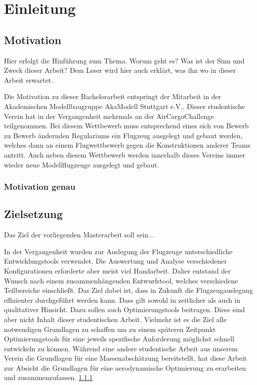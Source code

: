 \chapter{Einleitung}					%
\label{chap:einleitung}					%

\section{Motivation}					%
\label{sec:motivation}
Hier erfolgt die Hinführung zum Thema. Worum geht es? Was ist der Sinn und Zweck dieser Arbeit? Dem Leser wird hier auch erklärt, was ihn wo in dieser Arbeit erwartet.

Die Motivation zu dieser Bachelorarbeit entspringt der Mitarbeit in der Akademischen Modellbaugruppe AkaModell Stuttgart e.V.. Dieser studentische Verein hat in der Vergangenheit mehrmals an der AirCargoChallenge teilgenommen. Bei diesem Wettbewerb muss entsprechend eines sich von Bewerb zu Bewerb ändernden Regulariums ein Flugzeug ausgelegt und gebaut werden, welches dann an einem Flugwettbewerb gegen die Konstruktionen anderer Teams antritt. Auch neben diesem Wettbewerb werden innerhalb dieses Vereins immer wieder neue Modellflugzeuge ausgelegt und gebaut.

\subsection{Motivation genau}			%
\label{subsec:motgenau}

\section{Zielsetzung}
\label{sec:zielsetzung}
Das Ziel der vorliegenden Masterarbeit soll sein...

In der Vergangenheit wurden zur Auslegung der Flugzeuge unterschiedliche Entwicklungstools verwendet. Die Auswertung und Analyse verschiedener Konfigurationen erforderte aber meist viel Handarbeit. Daher entstand der Wunsch nach einem zusammenhängenden Entwurfstool, welches verschiedene Teilbereiche einschließt. Das Ziel dabei ist, dass in Zukunft die Flugzeugauslegung effizienter durchgeführt werden kann. Dass gilt sowohl in zeitlicher als auch in qualitativer Hinsicht. Dazu sollen auch Optimierungstools beitragen. Diese sind aber nicht Inhalt dieser studentischen Arbeit. Vielmehr ist es die Ziel alle notwendigen Grundlagen zu schaffen um zu einem späteren Zeitpunkt Optimierungstools für eine jeweils spezifische Anforderung möglichst schnell entwickeln zu können.
Während eine andere studentische Arbeit aus unserem Verein die Grundlagen für eine Massenabschätzung bereitstellt, hat diese Arbeit zur Absicht die Grundlagen für eine aerodynamische Optimierung zu erarbeiten und zusammenzufassen.
\ref{subsec:motgenau}				%

